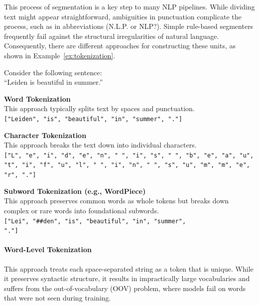 This process of segmentation is a key step to many NLP pipelines. While dividing text might appear straightforward, ambiguities in punctuation complicate the process, such as in abbreviations (N.L.P. or NLP?). Simple rule-based segmenters frequently fail against the structural irregularities of natural language. Consequently, there are different approaches for constructing these units, as shown in Example~\ref{ex:tokenization}. 

\begin{example}\label{ex:tokenization}
Consider the following sentence:\\ ``Leiden is beautiful in summer.''

\vspace{0.3cm}
\noindent\textbf{Word Tokenization} \\
This approach typically splits text by spaces and punctuation.\\
\vspace{0.1cm}
\noindent\texttt{["Leiden", "is", "beautiful", "in", "summer", "."]}

\vspace{0.4cm}
\noindent\textbf{Character Tokenization} \\
This approach breaks the text down into individual characters.\\
\vspace{0.1cm}
\noindent\texttt{["L", "e", "i", "d", "e", "n", " ", "i", "s", " ", "b", "e", "a", "u", "t", "i", "f", "u", "l", " ", "i", "n", " ", "s", "u", "m", "m", "e", "r", "."]}

\vspace{0.4cm}
\noindent\textbf{Subword Tokenization (e.g., WordPiece)} \\
This approach preserves common words as whole tokens but breaks down complex or rare words into foundational subwords.\\
\vspace{0.1cm}
\noindent\texttt{["Lei", "\#\#den", "is", "beautiful", "in", "summer",}\\ 
\noindent\texttt{"."]}
\end{example}

\paragraph{Word-Level Tokenization}
This approach treats each space-separated string as a token that is unique. While it preserves syntactic structure, it results in impractically large vocabularies and suffers from the out-of-vocabulary (OOV) problem, where models fail on words that were not seen during training.

